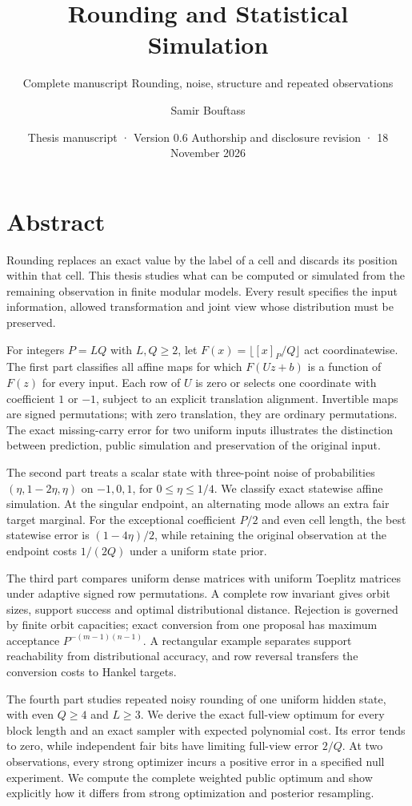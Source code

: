 \documentclass[
]{article}
\title{Rounding and Statistical Simulation}
\subtitle{Complete manuscript Rounding, noise, structure and repeated
observations}
\author{Samir Bouftass}
\date{Thesis manuscript · Version 0.6 Authorship and disclosure revision
· 18 November 2026}
\begin{document}
\maketitle

\section{Abstract}\label{abstract}

Rounding replaces an exact value by the label of a cell and discards its
position within that cell. This thesis studies what can be computed or
simulated from the remaining observation in finite modular models. Every
result specifies the input information, allowed transformation and joint
view whose distribution must be preserved.

For integers \(P=LQ\) with \(L,Q\ge2\), let
\(F(x)=\lfloor[x]_P/Q\rfloor\) act coordinatewise. The first part
classifies all affine maps for which \(F(Uz+b)\) is a function of
\(F(z)\) for every input. Each row of \(U\) is zero or selects one
coordinate with coefficient \(1\) or \(-1\), subject to an explicit
translation alignment. Invertible maps are signed permutations; with
zero translation, they are ordinary permutations. The exact
missing-carry error for two uniform inputs illustrates the distinction
between prediction, public simulation and preservation of the original
input.

The second part treats a scalar state with three-point noise of
probabilities \((\eta,1-2\eta,\eta)\) on \(-1,0,1\), for
\(0\le\eta\le1/4\). We classify exact statewise affine simulation. At
the singular endpoint, an alternating mode allows an extra fair target
marginal. For the exceptional coefficient \(P/2\) and even cell length,
the best statewise error is \((1-4\eta)/2\), while retaining the
original observation at the endpoint costs \(1/(2Q)\) under a uniform
state prior.

The third part compares uniform dense matrices with uniform Toeplitz
matrices under adaptive signed row permutations. A complete row
invariant gives orbit sizes, support success and optimal distributional
distance. Rejection is governed by finite orbit capacities; exact
conversion from one proposal has maximum acceptance \(P^{-(m-1)(n-1)}\).
A rectangular example separates support reachability from distributional
accuracy, and row reversal transfers the conversion costs to Hankel
targets.

The fourth part studies repeated noisy rounding of one uniform hidden
state, with even \(Q\ge4\) and \(L\ge3\). We derive the exact full-view
optimum for every block length and an exact sampler with expected
polynomial cost. Its error tends to zero, while independent fair bits
have limiting full-view error \(2/Q\). At two observations, every strong
optimizer incurs a positive error in a specified null experiment. We
compute the complete weighted public optimum and show explicitly how it
differs from strong optimization and posterior resampling.
\end{document}
